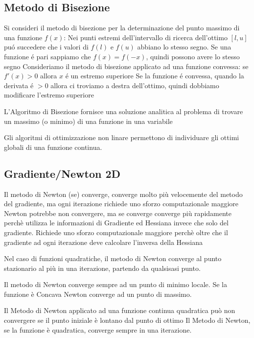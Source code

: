\documentclass[12pt, a4paper, openany]{book}
\begin{document}
\subsection{Metodo di Bisezione}
\affermazionetrue
{
    Si consideri il metodo di bisezione per la determinazione del punto massimo di una funzione $f(x)$: Nei punti estremi dell'intervallo
    di ricerca dell'ottimo $[l,u]$ puó succedere che i valori di $f(l)$ e $f(u)$ abbiano lo stesso segno.
}
{
    Se una funzione é pari sappiamo che $f(x)=f(-x)$, quindi possono avere lo stesso segno
}
\affermazionetrue
{Consideriamo il metodo di bisezione applicato ad una funzione convessa: se $f'(x)>0$ allora $x$ é un estremo superiore}
{Se la funzione é convessa, quando la derivata é $>0$ allora ci troviamo a destra dell'ottimo, quindi dobbiamo modificare l'estremo superiore}

\affermazione
{L'Algoritmo di Bisezione fornisce una soluzione analitica al problema di trovare un massimo (o minimo) di una funzione in una variabile}

\affermazione
{Gli algoritmi di ottimizzazione non linare permettono di individuare gli ottimi globali di una funzione continua.}

\subsection{Gradiente/Newton 2D}

\affermazionetrue
{Il metodo di Newton (se) converge, converge molto più velocemente del metodo del gradiente, ma ogni iterazione richiede uno sforzo computazionale maggiore}
{Newton potrebbe non convergere, ma se converge converge più rapidamente perchè utilizza le informazioni di Gradiente ed Hessiana invece che solo del gradiente.
Richiede uno sforzo computazionale maggiore perchè oltre che il gradiente ad ogni iterazione deve calcolare l'inversa della Hessiana}

\affermazionetrue
{Nel caso di funzioni quadratiche, il metodo di Newton converge al punto stazionario al più in una iterazione, partendo da qualsisasi punto.}

\affermazionefalse
{Il metodo di Newton converge sempre ad un punto di minimo locale.}
{Se la funzione è Concava Newton converge ad un punto di massimo.}

\affermazionefalse
{Il Metodo di Newton applicato ad una funzione continua quadratica può non convergere se il punto iniziale è lontano dal punto di ottimo}
{Il Metodo di Newton, se la funzione è quadratica, converge sempre in una iterazione.}
\end{document}
